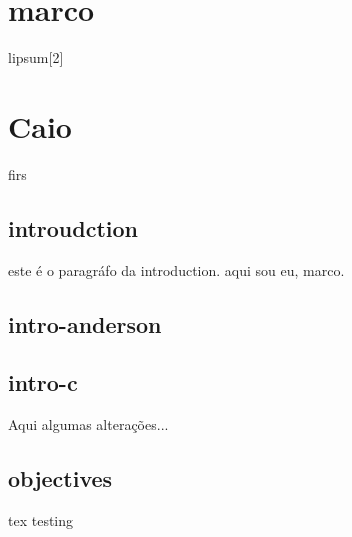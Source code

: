 
    \section{marco}
    lipsum[2]
    \section{Caio}
    firs

    \subsection{introudction}
    este é o paragráfo da introduction.
    aqui sou eu, marco.

    \subsection{intro-anderson}

    \subsection{intro-c}
        Aqui algumas alterações...


    \subsection{objectives}
    tex testing
    




